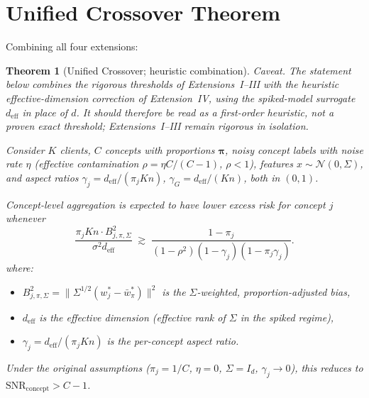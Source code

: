 \documentclass[11pt,a4paper]{article}
\newtheorem{theorem}{Theorem}
\newcommand{\SNR}{\mathrm{SNR}}
\newcommand{\wbar}{\bar{w}}
\newcommand{\Id}{I_d}
\newcommand{\deff}{d_{\mathrm{eff}}}
\begin{document}
\section{Unified Crossover Theorem}

Combining all four extensions:

\begin{theorem}[Unified Crossover; heuristic combination]\label{thm:unified}
\emph{Caveat.} The statement below combines the rigorous thresholds of Extensions~I--III with the \emph{heuristic} effective-dimension correction of Extension~IV, using the spiked-model surrogate $\deff$ in place of $d$. It should therefore be read as a first-order heuristic, not a proven exact threshold; Extensions~I--III remain rigorous in isolation.

Consider $K$ clients, $C$ concepts with proportions $\boldsymbol{\pi}$, noisy concept labels with noise rate $\eta$ (effective contamination $\rho = \eta C/(C-1)$, $\rho < 1$), features $x \sim \mathcal{N}(0, \Sigma)$, and aspect ratios $\gamma_j = \deff / (\pi_j Kn)$, $\gamma_G = \deff/(Kn)$, both in $(0,1)$.

Concept-level aggregation is expected to have lower excess risk for concept $j$ whenever
\begin{equation}\label{eq:unified}
\frac{\pi_j K n \cdot B_{j,\pi,\Sigma}^2}{\sigma^2 \deff}
\;\gtrsim\; \frac{1 - \pi_j}{(1 - \rho^2)(1 - \gamma_j)(1 - \pi_j \gamma_j)}.
\end{equation}
where:
\begin{itemize}[nosep]
\item $B_{j,\pi,\Sigma}^2 = \|\Sigma^{1/2}(w_j^* - \wbar^*_\pi)\|^2$ is the $\Sigma$-weighted, proportion-adjusted bias,
\item $\deff$ is the effective dimension (effective rank of $\Sigma$ in the spiked regime),
\item $\gamma_j = \deff / (\pi_j K n)$ is the per-concept aspect ratio.
\end{itemize}

\noindent Under the original assumptions ($\pi_j = 1/C$, $\eta = 0$, $\Sigma = \Id$, $\gamma_j \to 0$), this reduces to $\SNR_{\mathrm{concept}} > C - 1$.
\end{theorem}
\end{document}
